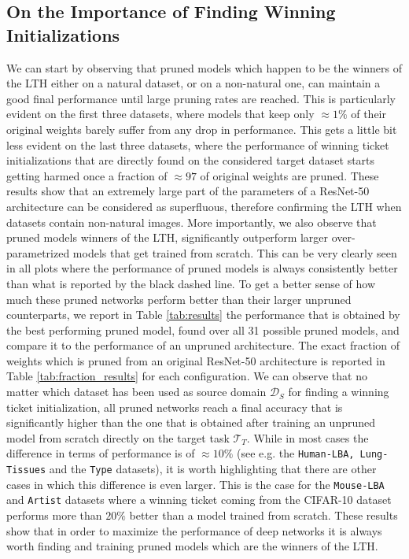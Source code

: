 \subsection{On the Importance of Finding Winning Initializations}
We can start by observing that pruned models which happen to be the winners of the LTH either on a natural dataset, or on a non-natural one, can maintain a good final performance until large pruning rates are reached. This is particularly evident on the first three datasets, where models that keep only $\approx 1\%$ of their original weights barely suffer from any drop in performance. This gets a little bit less evident on the last three datasets, where the performance of winning ticket initializations that are directly found on the considered target dataset starts getting harmed once a fraction of $\approx 97$ of original weights are pruned. These results show that an extremely large part of the parameters of a ResNet-50 architecture can be considered as superfluous, therefore confirming the LTH when datasets contain non-natural images. More importantly, we also observe that pruned models winners of the LTH, significantly outperform larger over-parametrized models that get trained from scratch. This can be very clearly seen in all plots where the performance of pruned models is always consistently better than what is reported by the black dashed line. To get a better sense of how much these pruned networks perform better than their larger unpruned counterparts, we report in Table \ref{tab:results} the performance that is obtained by the best performing pruned model, found over all 31 possible pruned models, and compare it to the performance of an unpruned architecture. The exact fraction of weights which is pruned from an original ResNet-50 architecture is reported in Table \ref{tab:fraction_results} for each configuration. We can observe that no matter which dataset has been used as source domain $\mathcal{D}_S$ for finding a winning ticket initialization, all pruned networks reach a final accuracy that is significantly higher than the one that is obtained after training an unpruned model from scratch directly on the target task $\mathcal{T}_T$. While in most cases the difference in terms of performance is of $\approx 10\%$ (see e.g. the \texttt{Human-LBA, Lung-Tissues} and the \texttt{Type} datasets), it is worth highlighting that there are other cases in which this difference is even larger. This is the case for the \texttt{Mouse-LBA} and \texttt{Artist}  datasets where a winning ticket coming from the CIFAR-10 dataset performs more than $20\%$ better than a model trained from scratch. These results show that in order to maximize the performance of deep networks it is always worth finding and training pruned models which are the winners of the LTH.

